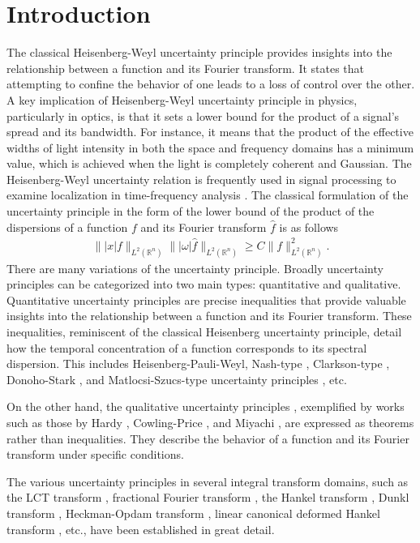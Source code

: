 \documentclass[12pt,a4paper,reqno]{amsproc}
\theoremstyle{definition}
\theoremstyle{remark}
\numberwithin{equation}{section}
\begin{document}
\section{Introduction}
The classical Heisenberg-Weyl uncertainty principle provides insights into the relationship between a function and its Fourier transform. It states that attempting to confine the behavior of one leads to a loss of control over the other. A key implication of Heisenberg-Weyl uncertainty principle in physics, particularly in optics, is that it sets a lower bound for the product of a signal's spread and its bandwidth. For instance, it means that the product of the effective widths of light intensity in both the space and frequency domains has a minimum value, which is achieved when the light is completely coherent and Gaussian. The Heisenberg-Weyl uncertainty relation is frequently used in signal processing to examine localization in time-frequency analysis \cite{almeida1994fractional}. The classical formulation of the uncertainty principle \cite{folland1997uncertainty} in the form of the lower bound of the product of the dispersions of a function $f$ and its Fourier transform $\hat{f}$ is as follows
\begin{eqnarray}  \label{e:1.1} \||x|f\|_{L^2(\mathbb{R}^n)}\||\omega|\hat{f}\|_{L^2(\mathbb{R}^n)}\geq C\|f\|^2_{L^2(\mathbb{R}^n)}.
\end{eqnarray}
There are many variations of the uncertainty principle. Broadly uncertainty principles can be categorized into two main types: quantitative and qualitative. 
Quantitative uncertainty principles \cite{mejjaoli2022new, Sahbani} are precise inequalities that provide valuable insights into the relationship between a function and its Fourier transform. These inequalities, reminiscent of the classical Heisenberg uncertainty principle, detail how the temporal concentration of a function corresponds to its spectral dispersion. This includes Heisenberg-Pauli-Weyl, Nash-type \cite{carlen1993sharp}, Clarkson-type \cite{Carlson}, Donoho-Stark \cite{donoho1989uncertainty}, and Matlocsi-Szucs-type uncertainty principles \cite{matolcsi1973intersection}, etc.
\par On the other hand, the qualitative uncertainty principles \cite{folland1997uncertainty}, exemplified by works such as those by Hardy \cite{hardy1933theorem, sitaram1997}, Cowling-Price \cite{cowling1983generalisations}, and Miyachi \cite{miyachi1997generalization}, are expressed as theorems rather than inequalities. They describe the behavior of a function and its Fourier transform under specific conditions.
\par The various uncertainty principles in several integral transform domains, such as the LCT transform \cite{guanlei2010uncertainty}, fractional Fourier transform \cite{shinde2001uncertainty}, the Hankel transform \cite{rosler1999uncertaintyy},  Dunkl transform \cite{ghobber2013uncertainty, rosler1999uncertainty, soltani2013heisenberg, soltani2013general, soltani2014p, soltani2017uncertainty}, Heckman-Opdam transform \cite{johansen2016uncertainty}, linear canonical deformed Hankel transform \cite{mejjaoli2023linear}, etc., have been established in great detail.
\end{document}
